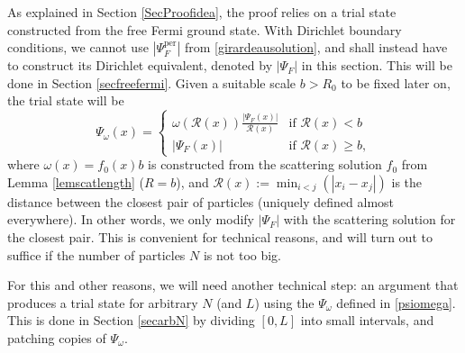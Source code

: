 \documentclass[a4paper,11pt]{article}
\newcommand{\abs}[1]{\left\lvert #1 \right\rvert}
\newcommand{\rr}{\mathcal{R}}
\numberwithin{equation}{section}
\begin{document}
As explained in Section \ref{SecProofidea}, the proof relies on a trial state constructed from the free Fermi ground state. With Dirichlet boundary conditions, we cannot use $\abs{\Psi^{\text{per}}_F}$ from \eqref{girardeausolution}, and shall instead have to construct its Dirichlet equivalent, denoted by $\abs{\Psi_F}$ in this section. This will be done in Section \ref{secfreefermi}. Given a suitable scale $ b>R_0 $ to be fixed later on, the trial state will be	
\begin{equation}
\label{psiomega}
\Psi_\omega(x)=\begin{cases}
	\omega(\rr(x))\frac{\abs{\Psi_F(x)}}{\rr(x)}& \text{if }\rr(x)<b\\
	\abs{\Psi_F(x)}&\text{if }\rr(x)\geq b,
	\end{cases}
	\end{equation}  
	where $ \omega(x)=f_0(x)b$ is constructed from the scattering solution $f_0$ from Lemma \ref{lemscatlength} ($R=b$),  and $\rr(x):=\min_{i<j}(\abs{x_i-x_j}) $ is the distance between the closest pair of particles (uniquely defined almost everywhere). In other words, we only modify $|\Psi_F|$ with the scattering solution for the closest pair. This is convenient for technical reasons, and will turn out to suffice if the number of particles $N$ is not too big.

For this and other reasons, we will need another technical step: an argument that produces a trial state for arbitrary $N$ (and $L$) using the $\Psi_\omega$ defined in \eqref{psiomega}. This is done in Section \ref{secarbN} by dividing $[0,L]$ into small intervals, and patching copies of $\Psi_\omega$. 
\end{document}

